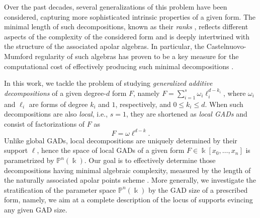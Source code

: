 \documentclass{amsart}
\theoremstyle{plain}
\renewcommand{\k}{\Bbbk}
\renewcommand{\P}{\mathbb{P}}
\def\P{{\mathbb{P}}}
\numberwithin{equation}{section}
\begin{document}
Over the past decades, several generalizations of this problem have been considered, capturing more sophisticated intrinsic properties of a given form.
The minimal length of such decompositions, known as their \emph{ranks} \cite{BBM14}, reflects different aspects of the complexity of the considered form and is deeply intertwined with %
the structure of the associated apolar algebras.
In particular, the Castelnuovo-Mumford regularity of such algebras has proven to be a key measure for the computational cost of effectively producing such minimal decompositions \cite{BMT25,BOT24,GKT25,LKS25}.

In this work, we tackle the problem of studying \emph{generalized additive decompositions} \cite{IK99} of a given degree-$d$ form $F$, namely $F = \sum_{i=1}^s \omega_i \ell_i^{d-k_i}$, where $\omega_i$ and $\ell_i$ are forms of degree $k_i$ and $1$, respectively, and $0\leq k_i\leq d$.
When such decompositions are also \emph{local}, i.e., $s=1$, they are shortened as \emph{local GADs} and consist of factorizations of $F$ as
\[ F = \omega \ell^{d-k}. \]
Unlike global GADs, local decompositions are uniquely determined by their support $\ell$, hence the space of local GADs of a given form $F \in \k[x_0,\dots,x_n]$ is parametrized by $\P^n(\k)$.
Our goal is to effectively determine those decompositions having minimal algebraic complexity, measured by the length of the naturally associated apolar points scheme \cite{BJMR18,BOT24}.
More generally, we investigate the stratification of the parameter space $\P^n(\k)$ by the GAD size of a prescribed form, namely, we aim at a complete description of the locus of supports evincing any given GAD size.
\end{document}
